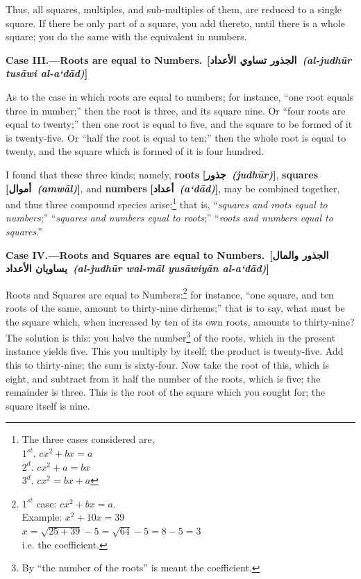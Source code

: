 Thus, all squares, multiples, and sub-multiples of them, are reduced to a single square. If there be only part of a square, you add thereto, until there is a whole square; you do the same with the equivalent in numbers.

\vspace{0.3cm}
\noindent\textbf{Case III.---Roots are equal to Numbers.}\
\hfill\textbf{[\arabicfont\beginR الجذور تساوي الأعداد\endR\ \textit{(al-judh\=ur tus\=awi al-a`d\=ad)}]}

As to the case in which roots are equal to numbers; for instance, ``one root equals three in number;'' then the root is three, and its square nine. Or ``four roots are equal to twenty;'' then one root is equal to five, and the square to be formed of it is twenty-five. Or ``half the root is equal to ten;'' then the whole root is equal to twenty, and the square which is formed of it is four hundred.

\vspace{0.5cm}
I found that these three kinds; namely, \textbf{roots} \textbf{[\arabicfont\beginR جذور\endR\ \textit{(judh\=ur)}]}, \textbf{squares} \textbf{[\arabicfont\beginR أموال\endR\ \textit{(amw\=al)}]}, and \textbf{numbers} \textbf{[\arabicfont\beginR أعداد\endR\ \textit{(a`d\=ad)}]}, may be combined together, and thus three compound species arise;\footnote{The three cases considered are,\\\null\hspace{1cm}$1^{st}$. $cx^2 + bx = a$\\\null\hspace{1cm}$2^{d}$. $cx^2 + a = bx$\\\null\hspace{1cm}$3^{d}$. $cx^2 = bx + a$} that is, ``\textit{squares and roots equal to numbers};'' ``\textit{squares and numbers equal to roots};'' ``\textit{roots and numbers equal to squares}.''

\vspace{0.3cm}
\noindent\textbf{Case IV.---Roots and Squares are equal to Numbers.}\
\hfill\textbf{[\arabicfont\beginR الجذور والمال يساويان الأعداد\endR\ \textit{(al-judh\=ur wal-m\=al yus\=awiy\=an al-a`d\=ad)}]}

Roots and Squares are equal to Numbers;\footnote{$1^{st}$ case: $cx^2 + bx = a$.\\Example: $x^2 + 10x = 39$\\$x = \sqrt{25 + 39} - 5 = \sqrt{64} - 5 = 8 - 5 = 3$\\i.e. the coefficient.} for instance, ``one square, and ten roots of the same, amount to thirty-nine dirhems;'' that is to say, what must be the square which, when increased by ten of its own roots, amounts to thirty-nine? The solution is this: you halve the number\footnote{By ``the number of the roots'' is meant the coefficient.} of the roots, which in the present instance yields five. This you multiply by itself; the product is twenty-five. Add this to thirty-nine; the sum is sixty-four. Now take the root of this, which is eight, and subtract from it half the number of the roots, which is five; the remainder is three. This is the root of the square which you sought for; the square itself is nine.

